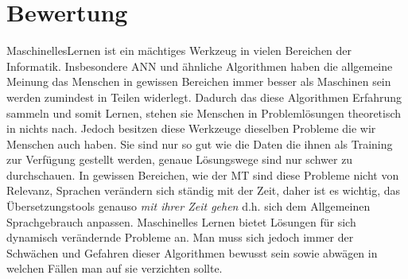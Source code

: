 \documentclass{thesisclass}
\begin{document}
\section{\textbf{Bewertung}}
\gls{MaschinellesLernen} ist ein mächtiges Werkzeug in vielen Bereichen der Informatik. Insbesondere \gls{ANN} und ähnliche Algorithmen haben die allgemeine Meinung das Menschen in gewissen Bereichen immer besser als Maschinen sein werden zumindest in Teilen widerlegt. Dadurch das diese Algorithmen Erfahrung sammeln und somit Lernen, stehen sie Menschen in Problemlösungen theoretisch in nichts nach.\newline
Jedoch besitzen diese Werkzeuge dieselben Probleme die wir Menschen auch haben. Sie sind nur so gut wie die Daten die ihnen als Training zur Verfügung gestellt werden, genaue Lösungswege sind nur schwer zu durchschauen. In gewissen Bereichen, wie der \gls{MT} sind diese Probleme nicht von Relevanz, Sprachen verändern sich ständig mit der Zeit, daher ist es wichtig, das Übersetzungstools genauso \textit{mit ihrer Zeit gehen} d.h. sich dem Allgemeinen Sprachgebrauch anpassen. Maschinelles Lernen bietet Lösungen für sich dynamisch verändernde Probleme an. Man muss sich jedoch immer der Schwächen und Gefahren dieser Algorithmen bewusst sein sowie abwägen in welchen Fällen man auf sie verzichten sollte.
\mainmatter
{}

\cleardoublepage
{}
{}

{}	%
{}	%




%


\cleardoublepage
\printglossary
\end{document}
